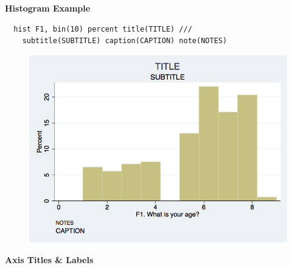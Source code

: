 \documentclass[]{book}
\begin{document}
\textbf{Histogram Example}

\begin{verbatim}
  hist F1, bin(10) percent title(TITLE) ///
    subtitle(SUBTITLE) caption(CAPTION) note(NOTES)
\end{verbatim}

\begin{figure}
\centering
\includegraphics{Stata/StataModGraph/images/hist1.png}
\caption{}
\end{figure}

\textbf{Axis Titles \& Labels}
\end{document}
